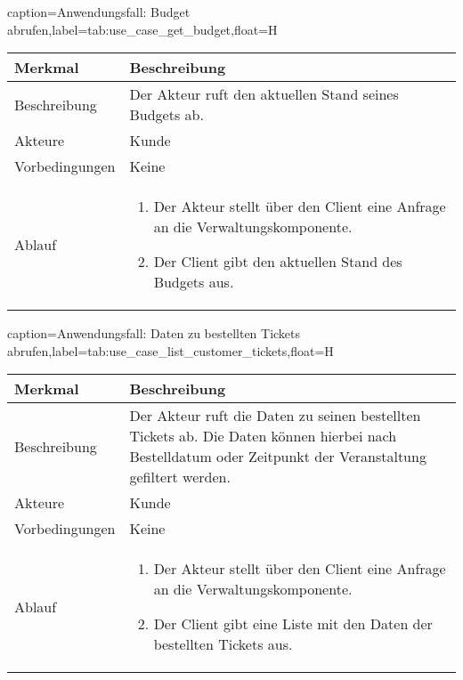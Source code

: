 \begin{dhbwtable}{caption={Anwendungsfall: Budget abrufen},label=tab:use_case_get_budget,float=H}
    \begin{tabularx}{\textwidth}{lX}
        \toprule
        \textbf{Merkmal} & \textbf{Beschreibung}  \\ \midrule
        Beschreibung    &  Der Akteur ruft den aktuellen Stand seines Budgets ab. \\
        Akteure         &  Kunde \\
        Vorbedingungen  &  Keine \\
        Ablauf          & \begin{minipage}[t]{\linewidth}
        \vspace*{-3mm}
        \begin{enumerate}[leftmargin=*,nosep,after=\strut]
            \item Der Akteur stellt über den Client eine Anfrage an die Verwaltungskomponente.
            \item Der Client gibt den aktuellen Stand des Budgets aus.
        \end{enumerate}
        \end{minipage} \\\bottomrule
    \end{tabularx}    
\end{dhbwtable}

\begin{dhbwtable}{caption={Anwendungsfall: Daten zu bestellten Tickets abrufen},label=tab:use_case_list_customer_tickets,float=H}
    \begin{tabularx}{\textwidth}{lX}
        \toprule
        \textbf{Merkmal} & \textbf{Beschreibung}  \\ \midrule
        Beschreibung    & Der Akteur ruft die Daten zu seinen bestellten Tickets ab. Die Daten können hierbei nach Bestelldatum oder Zeitpunkt der Veranstaltung gefiltert werden. \\
        Akteure         & Kunde \\
        Vorbedingungen  & Keine \\
        Ablauf          & \begin{minipage}[t]{\linewidth}
        \vspace*{-3mm}
        \begin{enumerate}[leftmargin=*,nosep,after=\strut]
            \item Der Akteur stellt über den Client eine Anfrage an die Verwaltungskomponente.
            \item Der Client gibt eine Liste mit den Daten der bestellten Tickets aus.
        \end{enumerate}
        \end{minipage} \\\bottomrule
    \end{tabularx}    
\end{dhbwtable}


